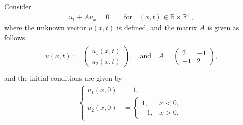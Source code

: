 \documentclass[12pt]{article}
\begin{document}
\clearpage
\begin{example}
	Consider
	\begin{align*}
		u_t + Au_x = 0 \qquad\text{for}\quad (x,t)\in \mathbb{R} \times \mathbb{R}^+,
	\end{align*}
	where the unknown vector $u(x,t)$ is defined, and the matrix $A$ is given as follows
	\begin{align*}
		\begin{array}{l}
			u(x, t) :=
			\begin{pmatrix} u_1(x,t) \\ u_2(x,t) \end{pmatrix},
			\quad\text{and}\quad
			A = \begin{pmatrix} 2 & -1 \\ -1 & 2 \end{pmatrix}, \\
		\end{array}
	\end{align*}
	and the initial conditions are given by
	\begin{align*}
		\begin{cases}
			u_1(x, 0) & = 1, \\
			u_2(x, 0) & =
			\begin{cases}
				1,  & x < 0, \\
				-1, & x > 0.
			\end{cases}
		\end{cases}
	\end{align*}
\end{example}
\end{document}
